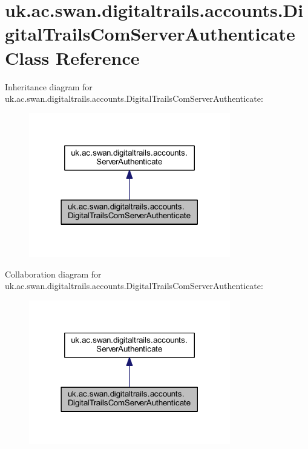 \hypertarget{classuk_1_1ac_1_1swan_1_1digitaltrails_1_1accounts_1_1_digital_trails_com_server_authenticate}{\section{uk.\+ac.\+swan.\+digitaltrails.\+accounts.\+Digital\+Trails\+Com\+Server\+Authenticate Class Reference}
\label{classuk_1_1ac_1_1swan_1_1digitaltrails_1_1accounts_1_1_digital_trails_com_server_authenticate}
}


Inheritance diagram for uk.\+ac.\+swan.\+digitaltrails.\+accounts.\+Digital\+Trails\+Com\+Server\+Authenticate\+:\nopagebreak
\begin{figure}[H]
\begin{center}
\leavevmode
\includegraphics[width=249pt]{classuk_1_1ac_1_1swan_1_1digitaltrails_1_1accounts_1_1_digital_trails_com_server_authenticate__inherit__graph}
\end{center}
\end{figure}


Collaboration diagram for uk.\+ac.\+swan.\+digitaltrails.\+accounts.\+Digital\+Trails\+Com\+Server\+Authenticate\+:\nopagebreak
\begin{figure}[H]
\begin{center}
\leavevmode
\includegraphics[width=249pt]{classuk_1_1ac_1_1swan_1_1digitaltrails_1_1accounts_1_1_digital_trails_com_server_authenticate__coll__graph}
\end{center}
\end{figure}
